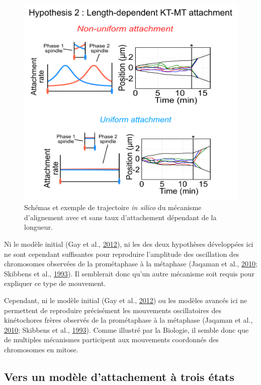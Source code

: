 \documentclass[12pt,a4paper,twoside,openright]{book}
\begin{document}
\begin{figure}[htbp]
\centering
\includegraphics{figures/results/modelling/hyp2.png}
\caption{\label{fig:hyp2}Schémas et exemple de trajectoire \emph{in
silico} du mécanisme d'alignement avec et sans taux d'attachement
dépendant de la longueur.}
\end{figure}

Ni le modèle initial (Gay et al.,
\protect\hyperlink{ref-Gay2012a}{2012}), ni les des deux hypothèses
développées ici ne sont cependant suffisantes pour reproduire
l'amplitude des oscillation des chromosomes observées de la prométaphase
à la métaphase (Jaqaman et al.,
\protect\hyperlink{ref-Jaqaman2010}{2010}; Skibbens et al.,
\protect\hyperlink{ref-Skibbens1993}{1993}). Il semblerait donc qu'un
autre mécanisme soit requis pour expliquer ce type de mouvement.

Cependant, ni le modèle initial (Gay et al.,
\protect\hyperlink{ref-Gay2012a}{2012}) ou les modèles avancés ici ne
permettent de reproduire précisément les mouvements oscillatoires des
kinétochores frères observés de la prométaphase à la métaphase (Jaqaman
et al., \protect\hyperlink{ref-Jaqaman2010}{2010}; Skibbens et al.,
\protect\hyperlink{ref-Skibbens1993}{1993}). Comme illustré par la
Biologie, il semble donc que de multiples mécanismes participent aux
mouvements coordonnés des chromosomes en mitose.

\subsection{Vers un modèle d'attachement à trois
états}\label{vers-un-moduxe8le-dattachement-uxe0-trois-uxe9tats}
\end{document}
